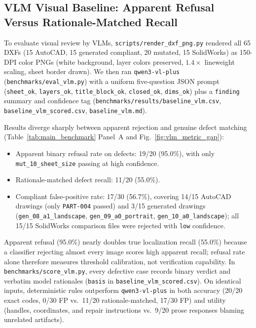\documentclass[nocopyright,nolists,upint,varvw,hyphenate]{asmejour}
\begin{document}
\subsection{VLM Visual Baseline: Apparent Refusal Versus Rationale-Matched Recall}\label{sec:vlm_gap}

To evaluate visual review by VLMs, \texttt{scripts/render\_dxf\_png.py} rendered all 65 DXFs (15 AutoCAD, 15 generated compliant, 20 mutated, 15 SolidWorks) as 150-DPI color PNGs (white background, layer colors preserved, $1.4\times$ lineweight scaling, sheet border drawn). We then ran \texttt{qwen3-vl-plus} (\texttt{benchmarks/eval\_vlm.py}) with a uniform five-question JSON prompt (\texttt{sheet\_ok}, \texttt{layers\_ok}, \texttt{title\_block\_ok}, \texttt{closed\_ok}, \texttt{dims\_ok}) plus a \texttt{finding} summary and confidence tag (\texttt{benchmarks/results/baseline\_vlm.csv}, \texttt{baseline\_vlm\_scored.csv}, \texttt{baseline\_vlm.md}).

Results diverge sharply between apparent rejection and genuine defect matching (Table~\ref{tab:main_benchmark} Panel~A and Fig.~\ref{fig:vlm_metric_gap}):
\begin{itemize}
\item Apparent binary refusal rate on defects: 19/20 (95.0\%), with only \texttt{mut\_10\_sheet\_size} passing at high confidence.
\item Rationale-matched defect recall: 11/20 (55.0\%).
\item Compliant false-positive rate: 17/30 (56.7\%), covering 14/15 AutoCAD drawings (only \texttt{PART-004} passed) and 3/15 generated drawings (\texttt{gen\_08\_a1\_landscape}, \texttt{gen\_09\_a0\_portrait}, \texttt{gen\_10\_a0\_landscape}); all 15/15 SolidWorks comparison files were rejected with \texttt{low} confidence.
\end{itemize}

Apparent refusal (95.0\%) nearly doubles true localization recall (55.0\%) because a classifier rejecting almost every image scores high apparent recall; refusal rate alone therefore measures threshold calibration, not verification capability. In \texttt{benchmarks/score\_vlm.py}, every defective case records binary verdict and verbatim model rationales (\texttt{basis} in \texttt{baseline\_vlm\_scored.csv}). On identical inputs, deterministic rules outperform \texttt{qwen3-vl-plus} in both accuracy (20/20 exact codes, 0/30 FP vs.\ 11/20 rationale-matched, 17/30 FP) and utility (handles, coordinates, and repair instructions vs.\ 9/20 prose responses blaming unrelated artifacts).
\end{document}

